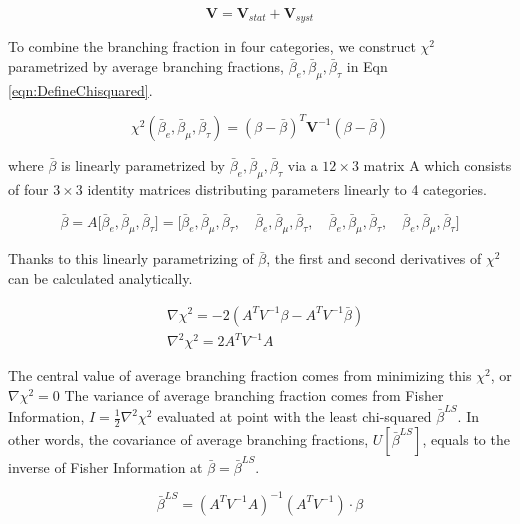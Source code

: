 \begin{equation}
    \textbf{V} = \textbf{V}_{stat} + \textbf{V}_{syst}
\end{equation}

To combine the branching fraction in four categories, we construct $\chi^2$ parametrized
by average branching fractions, $\bar{\beta}_e,\bar{\beta}_\mu, \bar{\beta}_\tau$ 
in Eqn \ref{eqn:DefineChisquared}. 

\begin{equation}
    \chi^2 (\bar{\beta}_e, \bar{\beta}_\mu, \bar{\beta}_\tau) = 
    (\beta - \bar{\beta} )^T \textbf{V}^{-1} (\beta - \bar{\beta} )
    \label{eqn:DefineChisquared}
\end{equation}

where $\bar{\beta}$ is linearly parametrized by $\bar{\beta}_e, \bar{\beta}_\mu, \bar{\beta}_\tau$ 
via a $12 \times 3$ matrix A which consists of four $3\times 3$ identity matrices
distributing parameters linearly to 4 categories.

\begin{equation}
    \bar{\beta} = A \bigg [ \bar{\beta}_e, \bar{\beta}_\mu, \bar{\beta}_\tau \bigg ]
    =
    \bigg [
    \bar{\beta}_e, \bar{\beta}_\mu, \bar{\beta}_\tau, \quad 
    \bar{\beta}_e, \bar{\beta}_\mu, \bar{\beta}_\tau, \quad 
    \bar{\beta}_e, \bar{\beta}_\mu, \bar{\beta}_\tau, \quad 
    \bar{\beta}_e, \bar{\beta}_\mu, \bar{\beta}_\tau
    \bigg ]
\end{equation}

Thanks to this linearly parametrizing of $\bar{\beta}$, the first and second 
derivatives of $\chi^2$ can be calculated analytically.

\begin{align}
    &\nabla \chi^2   = -2 (A^T V^{-1} \beta - A^T V^{-1} \bar{\beta} )
    \\
    &\nabla^2 \chi^2 = 2 A^T V^{-1} A 
\end{align}

The central value of average branching fraction comes from minimizing this $\chi ^2$, or
$\nabla \chi ^2 = 0$
The variance of average branching fraction comes from Fisher Information, 
$I = \frac{1}{2} \nabla^2 \chi^2 $ evaluated at 
point with the least chi-squared $\bar{\beta}^{LS}$.
In other words, the covariance of average branching fractions,  
$U [\bar{\beta}^{LS}]$,
equals to the inverse of
Fisher Information at $\bar{\beta} = \bar{\beta}^{LS}$.

\begin{equation}
    \boxed{ 
    \bar{\beta}^{LS}
    =   (A^T V^{-1} A)^{-1}(A^T V^{-1})  \cdot \beta
    }
    \label{eqn:combineMean}
\end{equation}

